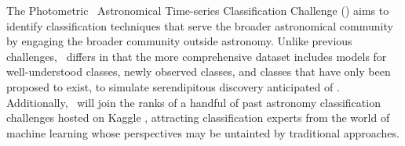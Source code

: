 The Photometric \lsst\ Astronomical Time-series Classification Challenge (\plasticc) aims to identify classification techniques that serve the broader astronomical community by engaging the broader community outside astronomy.
Unlike previous challenges, \plasticc\ differs in that the more comprehensive dataset includes models for well-understood classes, newly observed classes, and classes that have only been proposed to exist, to simulate serendipitous discovery anticipated of \lsst.
Additionally, \plasticc\ will join the ranks of a handful of past astronomy classification challenges hosted on Kaggle , attracting classification experts from the world of machine learning whose perspectives may be untainted by traditional approaches.



